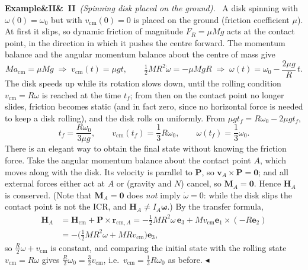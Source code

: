 \documentclass[11pt,a4paper,oneside]{report}
\numberwithin{equation}{chapter}
\newcommand{\vect}[1]{\bm{#1}}
\newcommand{\e}[1]{\vect{e}_{#1}}
\newcommand{\cm}{\mathrm{cm}}
\theoremstyle{plain}
\theoremstyle{definition}
\theoremstyle{remark}
\newenvironment{example}[2]{%
  \par\addvspace{\bigskipamount}\noindent
  \textbf{Example\ifx&#1&\else~#1\fi}\ \textit{(#2).}\ \ignorespaces}%
  {\hfill$\blacktriangleleft$\par\addvspace{\bigskipamount}}
\begin{document}
\begin{example}{II}{Spinning disk placed on the ground}
A disk spinning with $\omega(0)=\omega_0$ but with $v_\cm(0)=0$ is placed on the ground (friction coefficient $\mu$).
At first it slips, so dynamic friction of magnitude $F_R=\mu Mg$ acts at the contact point, in the direction in which it
pushes the centre forward. The momentum balance and the angular momentum balance about the centre of mass give
\[
  Ma_\cm=\mu Mg\;\Rightarrow\;v_\cm(t)=\mu gt,\qquad
  \tfrac12MR^2\dot\omega=-\mu MgR\;\Rightarrow\;\omega(t)=\omega_0-\frac{2\mu g}{R}\,t .
\]
The disk speeds up while its rotation slows down, until the rolling condition $v_\cm=R\omega$ is reached at the time
$t_f$; from then on the contact point no longer slides, friction becomes static (and in fact zero, since no horizontal
force is needed to keep a disk rolling), and the disk rolls on uniformly. From $\mu gt_f=R\omega_0-2\mu gt_f$,
\[
  t_f=\frac{R\omega_0}{3\mu g},\qquad v_\cm(t_f)=\frac13R\omega_0,\qquad\omega(t_f)=\frac13\omega_0 .
\]
There is an elegant way to obtain the final state without knowing the friction force. Take the angular momentum balance
about the contact point $A$, which moves along with the disk. Its velocity is parallel to $\vect P$, so
$\vect v_A\times\vect P=\vect 0$; and all external forces either act at $A$ or (gravity and $N$) cancel, so
$\vect M_A=\vect 0$. Hence $\vect H_A$ is conserved. (Note that $\vect M_A=\vect 0$ does \emph{not} imply
$\dot\omega=0$: while the disk slips the contact point is not the ICR, and $\vect H_A\neq I_A\vect\omega$.) By the
transfer formula,
\begin{align*}
  \vect H_A&=\vect H_\cm+\vect P\times\vect r_{\cm,A}=-\tfrac12MR^2\omega\,\e3+Mv_\cm\e1\times(-R\e2)\\
  &=-\big(\tfrac12MR^2\omega+MRv_\cm\big)\e3 ,
\end{align*}
so $\frac R2\omega+v_\cm$ is constant, and comparing the initial state with the rolling state $v_\cm=R\omega$ gives
$\frac R2\omega_0=\frac32v_\cm$, i.e.\ $v_\cm=\frac13R\omega_0$ as before.
\end{example}

\end{document}

